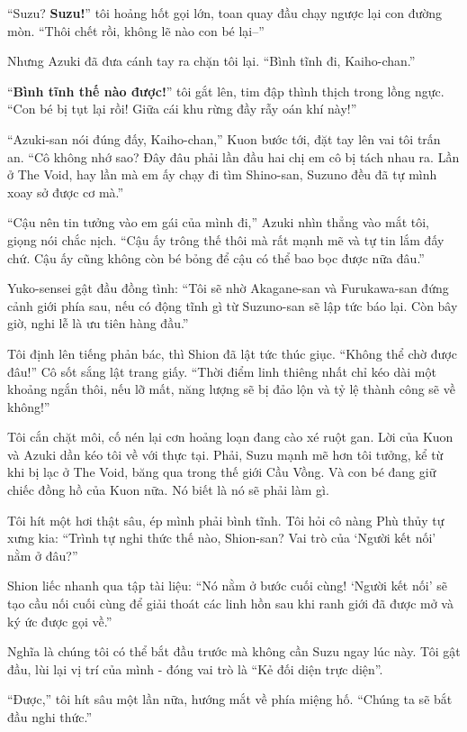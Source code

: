 \documentclass[../main.tex]{subfiles}
\begin{document}
``Suzu? \textbf{Suzu!}'' tôi hoảng hốt gọi lớn, toan quay đầu chạy ngược lại con đường mòn. ``Thôi chết rồi, không lẽ nào con bé lại--''

Nhưng Azuki đã đưa cánh tay ra chặn tôi lại. ``Bình tĩnh đi, Kaiho-chan.''

``\textbf{Bình tĩnh thế nào được!}'' tôi gắt lên, tim đập thình thịch trong lồng ngực. ``Con bé bị tụt lại rồi! Giữa cái khu rừng đầy rẫy oán khí này!''

``Azuki-san nói đúng đấy, Kaiho-chan,'' Kuon bước tới, đặt tay lên vai tôi trấn an. ``Cô không nhớ sao? Đây đâu phải lần đầu hai chị em cô bị tách nhau ra. Lần ở The Void, hay lần mà em ấy chạy đi tìm Shino-san, Suzuno đều đã tự mình xoay sở được cơ mà.''

``Cậu nên tin tưởng vào em gái của mình đi,'' Azuki nhìn thẳng vào mắt tôi, giọng nói chắc nịch. ``Cậu ấy trông thế thôi mà rất mạnh mẽ và tự tin lắm đấy chứ. Cậu ấy cũng không còn bé bỏng để cậu có thể bao bọc được nữa đâu.''

Yuko-sensei gật đầu đồng tình: ``Tôi sẽ nhờ Akagane-san và Furukawa-san đứng cảnh giới phía sau, nếu có động tĩnh gì từ Suzuno-san sẽ lập tức báo lại. Còn bây giờ, nghi lễ là ưu tiên hàng đầu.''

Tôi định lên tiếng phản bác, thì Shion đã lật tức thúc giục. ``Không thể chờ được đâu!'' Cô sốt sắng lật trang giấy. ``Thời điểm linh thiêng nhất chỉ kéo dài một khoảng ngắn thôi, nếu lỡ mất, năng lượng sẽ bị đảo lộn và tỷ lệ thành công sẽ về không!''

Tôi cắn chặt môi, cố nén lại cơn hoảng loạn đang cào xé ruột gan. Lời của Kuon và Azuki dần kéo tôi về với thực tại. Phải, Suzu mạnh mẽ hơn tôi tưởng, kể từ khi bị lạc ở The Void, băng qua trong thế giới Cầu Vồng. Và con bé đang giữ chiếc đồng hồ của Kuon nữa. Nó biết là nó sẽ phải làm gì.

Tôi hít một hơi thật sâu, ép mình phải bình tĩnh. Tôi hỏi cô nàng Phù thủy tự xưng kia: ``Trình tự nghi thức thế nào, Shion-san? Vai trò của `Người kết nối' nằm ở đâu?''

Shion liếc nhanh qua tập tài liệu: ``Nó nằm ở bước cuối cùng! `Người kết nối' sẽ tạo cầu nối cuối cùng để giải thoát các linh hồn sau khi ranh giới đã được mở và ký ức được gọi về.''

Nghĩa là chúng tôi có thể bắt đầu trước mà không cần Suzu ngay lúc này. Tôi gật đầu, lùi lại vị trí của mình - đóng vai trò là ``Kẻ đối diện trực diện''.

``Được,'' tôi hít sâu một lần nữa, hướng mắt về phía miệng hố. ``Chúng ta sẽ bắt đầu nghi thức.''
\end{document}
